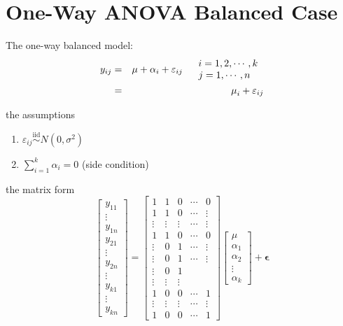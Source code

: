 \documentclass{article}
\begin{document}
\section{One-Way ANOVA Balanced Case}

The one-way balanced model:%
\begin{eqnarray*}
y_{ij} &=&\mu +\alpha _{i}+\varepsilon _{ij}\quad 
\begin{tabular}{l}
$i=1,2,\cdots ,k$ \\ 
$j=1,\cdots ,n$%
\end{tabular}
\\
&=&\mu _{i}+\varepsilon _{ij}
\end{eqnarray*}

the assumptions

\begin{enumerate}
\item $\varepsilon _{ij}\overset{\text{iid}}{\sim }N\left( 0,\sigma
^{2}\right) $

\item $\sum\limits_{i=1}^{k}\alpha _{i}=0$ (side condition)
\end{enumerate}

\bigskip

the matrix form%
\begin{equation*}
\left[ 
\begin{array}{c}
y_{11} \\ 
\vdots \\ 
y_{1n} \\ 
y_{21} \\ 
\vdots \\ 
y_{2n} \\ 
\vdots \\ 
y_{k1} \\ 
\vdots \\ 
y_{kn}%
\end{array}%
\right] =\left[ 
\begin{array}{ccccc}
1 & 1 & 0 & \cdots & 0 \\ 
1 & 1 & 0 & \cdots & \vdots \\ 
\vdots & \vdots & \vdots & \cdots & \vdots \\ 
1 & 1 & 0 & \cdots & 0 \\ 
\vdots & 0 & 1 & \cdots & \vdots \\ 
\vdots & 0 & 1 & \cdots & \vdots \\ 
\vdots & 0 & 1 &  &  \\ 
\vdots & \vdots & \vdots &  &  \\ 
1 & 0 & 0 & \cdots & 1 \\ 
\vdots & \vdots & \vdots & \cdots & \vdots \\ 
1 & 0 & 0 & \cdots & 1%
\end{array}%
\right] \left[ 
\begin{array}{c}
\mu \\ 
\alpha _{1} \\ 
\alpha _{2} \\ 
\vdots \\ 
\alpha _{k}%
\end{array}%
\right] +\mathbf{\epsilon }
\end{equation*}
\end{document}
